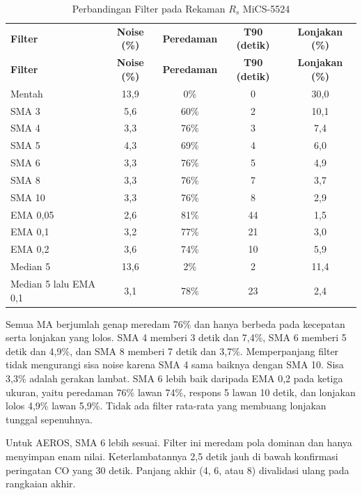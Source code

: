     \begin{longtable}{|l|c|c|c|c|}
        \caption{Perbandingan Filter pada Rekaman $R_s$ MiCS-5524}
        \label{tab:Ch03_Filter}
        \vspace{-0.75em}\\
        \hline
        \textbf{Filter} & \textbf{Noise (\%)} & \textbf{Peredaman} & \textbf{T90 (detik)} & \textbf{Lonjakan (\%)} \\ \hline
        \endfirsthead
        \hline
        \textbf{Filter} & \textbf{Noise (\%)} & \textbf{Peredaman} & \textbf{T90 (detik)} & \textbf{Lonjakan (\%)} \\ \hline
        \endhead
        Mentah & 13,9 & 0\% & 0 & 30,0 \\ \hline
        SMA 3 & 5,6 & 60\% & 2 & 10,1 \\ \hline
        SMA 4 & 3,3 & 76\% & 3 & 7,4 \\ \hline
        SMA 5 & 4,3 & 69\% & 4 & 6,0 \\ \hline
        SMA 6 & 3,3 & 76\% & 5 & 4,9 \\ \hline
        SMA 8 & 3,3 & 76\% & 7 & 3,7 \\ \hline
        SMA 10 & 3,3 & 76\% & 8 & 2,9 \\ \hline
        EMA 0,05 & 2,6 & 81\% & 44 & 1,5 \\ \hline
        EMA 0,1 & 3,2 & 77\% & 21 & 3,0 \\ \hline
        EMA 0,2 & 3,6 & 74\% & 10 & 5,9 \\ \hline
        Median 5 & 13,6 & 2\% & 2 & 11,4 \\ \hline
        Median 5 lalu EMA 0,1 & 3,1 & 78\% & 23 & 2,4 \\ \hline
    \end{longtable}

    Semua MA berjumlah genap meredam 76\% dan hanya berbeda pada kecepatan serta lonjakan yang lolos. SMA 4 memberi 3 detik dan 7,4\%, SMA 6 memberi 5 detik dan 4,9\%, dan SMA 8 memberi 7 detik dan 3,7\%. Memperpanjang filter tidak mengurangi sisa noise karena SMA 4 sama baiknya dengan SMA 10. Sisa 3,3\% adalah gerakan lambat. SMA 6 lebih baik daripada EMA 0,2 pada ketiga ukuran, yaitu peredaman 76\% lawan 74\%, respons 5 lawan 10 detik, dan lonjakan lolos 4,9\% lawan 5,9\%. Tidak ada filter rata-rata yang membuang lonjakan tunggal sepenuhnya.

    Untuk AEROS, SMA 6 lebih sesuai. Filter ini meredam pola dominan dan hanya menyimpan enam nilai. Keterlambatannya 2,5 detik jauh di bawah konfirmasi peringatan CO yang 30 detik. Panjang akhir (4, 6, atau 8) divalidasi ulang pada rangkaian akhir.

